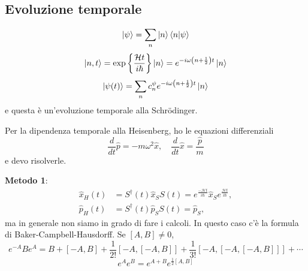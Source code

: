 \subsection{Evoluzione temporale}
\[
\ket{\psi} = \sum_n \ket{n}\braket{n|\psi}
\]
\[
\ket{n, t} = \exp \left\{ \frac{\mathcal{H}t}{i\hbar} \right\} \ket{n} =  e^{-i\omega\left( n + \frac{1}{2} \right) t} \ket{n}
\]
\[
\ket{\psi(t)} = \sum_n c_n^\psi e^{-i\omega \left( n + \frac{1}{2} \right) t} \ket{n}
\]
e questa è un'evoluzione temporale alla Schr\"odinger.

\bigskip
\noindent
Per la dipendenza temporale alla Heisenberg, ho le equazioni differenziali
\[
\frac{d}{dt} \hat{p} = -m\omega^2\hat{x}, \quad \frac{d}{dt}\hat{x} = \frac{\hat{p}}{m}
\]
e devo risolverle.

\bigskip
\noindent
\textbf{Metodo 1}:
\begin{align*}
\hat{x}_H(t) &= S^\dag(t) \hat{x}_S S(t) = e^{\frac{-\mathcal{H}t}{i\hbar}} \hat{x}_S e^{\frac{\mathcal{H}t}{i\hbar}}, \\
\hat{p}_H(t) &= S^\dag(t) \hat{p}_S S(t) = \hat{p}_S,
\end{align*}
ma in generale non siamo in grado di fare i calcoli. In questo caso c'è la formula di Baker-Campbell-Hausdorff. Se \( [A, B] \neq 0 \),
\[
e^{-A} B e^A = B + [-A, B] + \frac{1}{2!} \left[ -A, [-A, B] \right] + \frac{1}{3!} \left[ -A, \left[ -A, [-A, B] \right] \right] + \cdots
\]
\[
e^A e^B = e^{A + B} e^{\frac{1}{2}[A, B]}
\]

